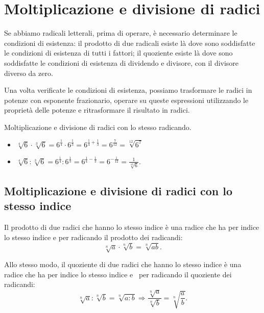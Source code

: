 
\section{Moltiplicazione e divisione di radici}
\label{sec:radici_moltiplicazione}

Se abbiamo radicali letterali, prima di operare, è necessario determinare le 
condizioni di esistenza: il prodotto di due radicali esiste là dove sono 
soddisfatte le condizioni di esistenza di tutti i fattori; 
il quoziente esiste là dove sono soddisfatte le condizioni di esistenza di 
dividendo e divisore, con il divisore diverso da zero.

Una volta verificate le condizioni di esistenza, possiamo trasformare le
radici in potenze con esponente frazionario, operare su queste espressioni 
utilizzando le proprietà delle potenze e ritrasformare il risultato in radici.

 \begin{esempio}
Moltiplicazione e divisione di radici con lo stesso radicando.
\begin{itemize}
\item $\sqrt[4]6\cdot \sqrt[3]6=6^{\frac 1 4}\cdot 6^{\frac 1 3}=
       6^{\frac 1 4+\frac 1 3}=6^{\frac 7{12}}=\sqrt[12]{6^7}$
\item $\sqrt[4]6:\sqrt[3]6=6^{\frac 1 4}:6^{\frac 1 3}=
       6^{\frac 1 4-\frac 1 3}=6^{-\frac 1{12}}=\frac 1{\sqrt[12]6}$.
\end{itemize}
 \end{esempio}

\subsection{Moltiplicazione e divisione di radici con lo stesso indice}
Il prodotto di due radici che hanno lo stesso indice è una radice che ha per 
indice lo stesso indice e per radicando il prodotto dei radicandi:
\[\sqrt[n]a\cdot \sqrt[n]b=\sqrt[n]{ab}.\]

Allo stesso modo, il quoziente di due radici che hanno lo stesso indice è una 
radice che ha per indice lo stesso indice e \ per radicando il quoziente dei 
radicandi:
\[\sqrt[n]a:\sqrt[n]b=\sqrt[n]{a:b} \Rightarrow \dfrac{\sqrt[n]a}{\sqrt[n]b}=
  \sqrt[n]{\dfrac a b}.\]

